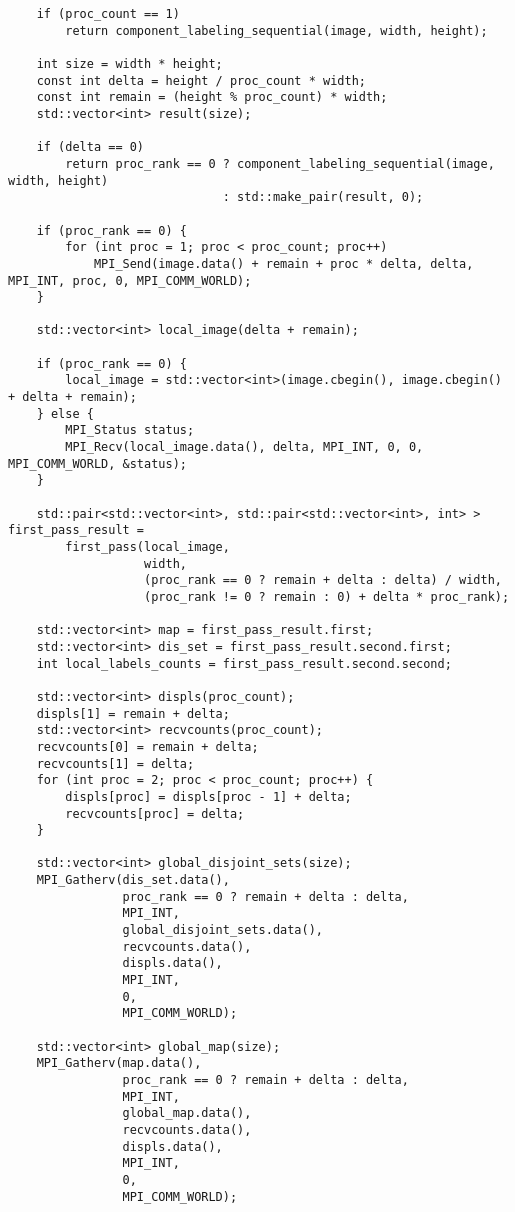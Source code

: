 \documentclass{report}
\begin{document}
\begin{lstlisting}
    if (proc_count == 1)
        return component_labeling_sequential(image, width, height);

    int size = width * height;
    const int delta = height / proc_count * width;
    const int remain = (height % proc_count) * width;
    std::vector<int> result(size);

    if (delta == 0)
        return proc_rank == 0 ? component_labeling_sequential(image, width, height)
                              : std::make_pair(result, 0);

    if (proc_rank == 0) {
        for (int proc = 1; proc < proc_count; proc++)
            MPI_Send(image.data() + remain + proc * delta, delta, MPI_INT, proc, 0, MPI_COMM_WORLD);
    }

    std::vector<int> local_image(delta + remain);

    if (proc_rank == 0) {
        local_image = std::vector<int>(image.cbegin(), image.cbegin() + delta + remain);
    } else {
        MPI_Status status;
        MPI_Recv(local_image.data(), delta, MPI_INT, 0, 0, MPI_COMM_WORLD, &status);
    }

    std::pair<std::vector<int>, std::pair<std::vector<int>, int> > first_pass_result =
        first_pass(local_image,
                   width,
                   (proc_rank == 0 ? remain + delta : delta) / width,
                   (proc_rank != 0 ? remain : 0) + delta * proc_rank);

    std::vector<int> map = first_pass_result.first;
    std::vector<int> dis_set = first_pass_result.second.first;
    int local_labels_counts = first_pass_result.second.second;

    std::vector<int> displs(proc_count);
    displs[1] = remain + delta;
    std::vector<int> recvcounts(proc_count);
    recvcounts[0] = remain + delta;
    recvcounts[1] = delta;
    for (int proc = 2; proc < proc_count; proc++) {
        displs[proc] = displs[proc - 1] + delta;
        recvcounts[proc] = delta;
    }

    std::vector<int> global_disjoint_sets(size);
    MPI_Gatherv(dis_set.data(),
                proc_rank == 0 ? remain + delta : delta,
                MPI_INT,
                global_disjoint_sets.data(),
                recvcounts.data(),
                displs.data(),
                MPI_INT,
                0,
                MPI_COMM_WORLD);

    std::vector<int> global_map(size);
    MPI_Gatherv(map.data(),
                proc_rank == 0 ? remain + delta : delta,
                MPI_INT,
                global_map.data(),
                recvcounts.data(),
                displs.data(),
                MPI_INT,
                0,
                MPI_COMM_WORLD);


\end{lstlisting}
\end{document}
